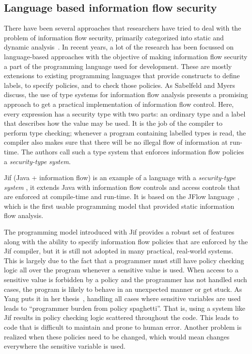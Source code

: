 \subsection{Language based information flow security \label{subsec:langinfo}}
There have been several approaches that researchers have tried to deal with the
problem of information flow security, primarily categorized into static and dynamic
analysis~\cite{Russo, Chlipala}. In recent years, a lot of the research has been
focussed on language-based approaches with the objective of making information
flow security a part of the programming language used for development. These are
mostly extensions to existing programming languages that provide constructs to define
labels, to specify policies, and to check those policies. As Sabelfeld and Myers~\cite{LangInfo}
discuss, the use of type systems for information flow analysis presents a promising
approach to get a practical implementation of information flow control. Here, every
expression has a security type with two parts: an ordinary type and a label that
describes how the value may be used. It is the job of the compiler to perform type
checking; whenever a program containing labelled types is read, the compiler also
makes sure that there will be no illegal flow of information at run-time. The authors
call such a type system that enforces information flow policies a \textit{security-type
system}.

Jif (Java + information flow) is an example of a language with a \textit{security-type system}
\cite{jifurl}, it extends Java with information flow controls and access controls
that are enforced at compile-time and run-time. It is based on the JFlow
language~\cite{Jflow}, which is the first usable programming model that provided
static information flow analysis.

The programming model introduced with Jif provides a robust set of features along
with the ability to specify information flow policies that are enforced by the Jif
compiler, but it is still not adopted in many practical, real-world systems. This
is largely due to the fact that a programmer must still have policy checking logic
all over the program whenever a sensitive value is used. When access to a sensitive
value is forbidden by a policy and the programmer has not handled such cases, the
program is likely to behave in an unexpected manner or get stuck. As Yang puts it
in her thesis~\cite{YangPhd}, handling all cases where sensitive variables are used
leads to ``programmer burden from policy spaghetti''. That is, using a system like
Jif results in policy checking logic scattered throughout the code. This leads to
code that is difficult to maintain and prone to human error. Another problem is
realized when these policies need to be changed, which would mean changes everywhere
the sensitive variable is used.

